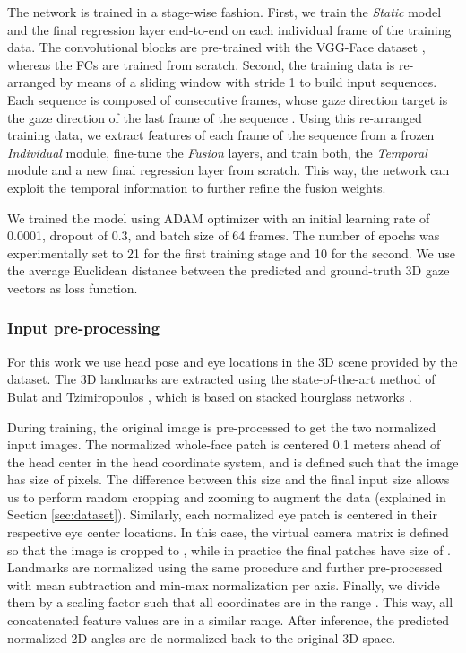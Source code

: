 \documentclass{bmvc2k}
\begin{document}
The network is trained in a stage-wise fashion. First, we train the \textit{Static} model and the final regression layer end-to-end on each individual frame of the training data. The convolutional blocks are pre-trained with the VGG-Face dataset \cite{Parkhi15}, whereas the FCs are trained from scratch. Second, the training data is re-arranged by means of a sliding window with stride 1 to build input sequences. Each sequence is composed of  consecutive frames, whose gaze direction target is the gaze direction of the last frame of the sequence  . Using this re-arranged training data, we extract features of each frame of the sequence from a frozen \textit{Individual} module, fine-tune the \textit{Fusion} layers, and train both, the \textit{Temporal} module and a new final regression layer from scratch. This way, the network can exploit the temporal information to further refine the fusion weights.

We trained the model using ADAM optimizer with an initial learning rate of 0.0001, dropout of 0.3, and batch size of 64 frames. The number of epochs was experimentally set to 21 for the first training stage and 10 for the second. We use the average Euclidean distance between the predicted and ground-truth 3D gaze vectors as loss function. 

\subsubsection{Input pre-processing}
For this work we use head pose and eye locations in the 3D scene provided by the dataset. The 3D landmarks are extracted using the state-of-the-art method of Bulat and Tzimiropoulos \cite{bulat2017far}, which is based on stacked hourglass networks \cite{newell2016stacked}. 

During training, the original image is pre-processed to get the two normalized input images. The normalized whole-face patch is centered 0.1 meters ahead of the head center in the head coordinate system, and  is defined such that the image has size of  pixels. The difference between this size and the final input size allows us to perform random cropping and zooming to augment the data (explained in Section \ref{sec:dataset}). Similarly, each normalized eye patch is centered in their respective eye center locations. In this case, the virtual camera matrix is defined so that the image is cropped to , while in practice the final patches have size of . Landmarks are normalized using the same procedure and further pre-processed with mean subtraction and min-max normalization per axis. Finally, we divide them by a scaling factor  such that all coordinates are in the range . This way, all concatenated feature values are in a similar range. After inference, the predicted normalized 2D angles are de-normalized back to the original 3D space.
\end{document}
